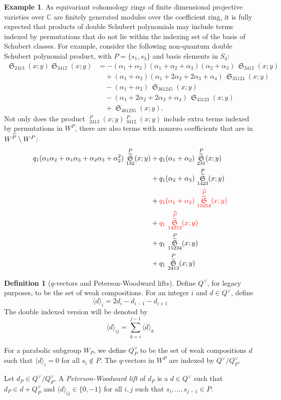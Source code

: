 \documentclass{amsart}
\theoremstyle{definition}
\newtheorem{definition}[lemma]{Definition}
\newtheorem{example}[lemma]{Example}
\theoremstyle{remark}
\numberwithin{equation}{section}
\DeclareMathOperator{\sch}{\mathfrak{S}}
\DeclareMathOperator{\qsch}{\widetilde{\mathfrak{S}}}
\begin{document}
\begin{example}
As equivariant cohomology rings of finite dimensional projective varieties over $\mathbb{C}$ are finitely generated modules over the coefficient ring, it is fully expected that products of double Schubert polynomials may include terms indexed by permutations that do not lie within the indexing set of the basis of Schubert classes. For example, consider the following non-quantum double Schubert polynomial product, with $P=\{s_1,s_3\}$ and basis elements in $S_4$:
\begin{align*}
\sch_{2413}(x;y)\sch_{3412}(x;y)
&= - (\alpha_1+\alpha_2)(\alpha_1+\alpha_2+\alpha_3)(\alpha_2+\alpha_3)\,\sch_{3412}(x;y) \\
&\quad + (\alpha_1+\alpha_2)(\alpha_1+2\alpha_2+2\alpha_3+\alpha_4)\,\sch_{35124}(x;y) \\
&\quad - (\alpha_1+\alpha_2)\,\sch_{361245}(x;y) \\
&\quad - (\alpha_1+2\alpha_2+2\alpha_3+\alpha_4)\,\sch_{45123}(x;y) \\
&\quad + \sch_{461235}(x;y).
\end{align*}
Not only does the product $\qsch_{2413}^{P}(x;y)\qsch_{3412}^{P}(x;y)$ include extra terms indexed by permutations in $W^P$, there are also terms with nonzero coefficients that are in $W^{\widehat{P}}\setminus W^P$:
\begin{align*}
q_1(\alpha_1\alpha_2+\alpha_1\alpha_3+\alpha_2\alpha_3+\alpha_2^2)\,\qsch_{132}^{P}(x;y)
&+ q_1(\alpha_1+\alpha_2)\,\qsch_{231}^{P}(x;y) \\
&+ q_1(\alpha_2+\alpha_3)\,\qsch_{1423}^{P}(x;y) \\
&+ \color{red}{q_1(\alpha_1+\alpha_2)\,\qsch_{13254}^{\pcomp{P}}(x;y)} \\
&+ \color{red}{q_1\,\qsch_{14253}^{\pcomp{P}}(x;y)} \\
&+ q_1\,\qsch_{15234}^{P}(x;y) \\
&+ q_1\,\qsch_{2413}^{P}(x;y)
\end{align*}
\end{example}


\begin{definition}[$q$-vectors and Peterson-Woodward lifts]
	Define $Q^\vee$, for legacy purposes, to be the set of weak compositions. For an integer $i$ and $d\in Q^\vee$, define
	$$\langle d\rangle_i = 2d_i - d_{i-1} - d_{i + 1}$$
	The double indexed version will be denoted by
	$$\langle d\rangle_{ij} = \sum_{k=i}^{j-1}\langle d\rangle_k$$

	For a parabolic subgroup $W_P$, we define $Q^\vee_P$ to be the set of weak compositions $d$ such that $\langle d\rangle_i = 0$ for all $s_i\notin P$. The $q$-vectors in $W^P$ are indexed by $Q^\vee/Q^\vee_P$.

	Let $d_P\in Q^\vee/Q^\vee_P$. A \emph{Peterson-Woodward lift} of $d_P$ is a $d\in Q^\vee$ such that $d_P\in d+ Q_P^\vee$ and $\langle d\rangle_{ij}\in \{0,-1\}$ for all $i,j$ such that $s_{i},\ldots,s_{j-1}\in P$.
 \end{definition}
\end{document}
